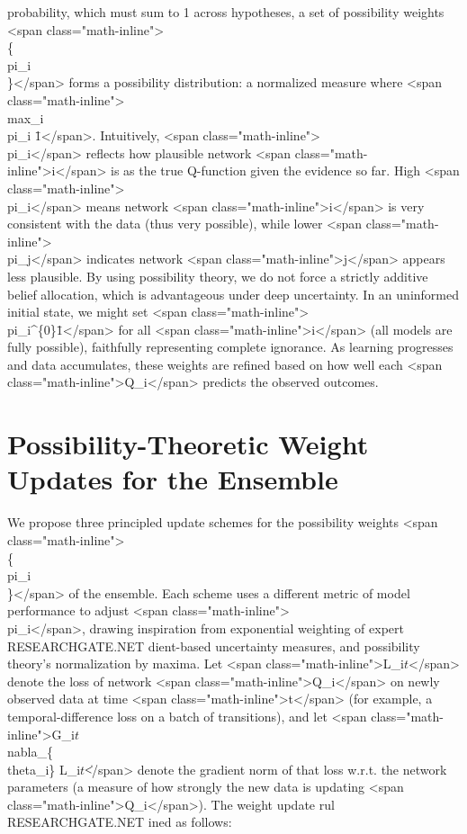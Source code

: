 \documentclass{article}
\begin{document}
probability, which must sum to 1 across hypotheses, a set of possibility weights <span class="math-inline">\\\{\\pi\_i\\\}</span> forms a possibility distribution: a normalized measure where <span class="math-inline">\\max\_i \\pi\_i \= 1</span>. Intuitively, <span class="math-inline">\\pi\_i</span> reflects how plausible network <span class="math-inline">i</span> is as the true Q-function given the evidence so far. High <span class="math-inline">\\pi\_i</span> means network <span class="math-inline">i</span> is very consistent with the data (thus very possible), while lower <span class="math-inline">\\pi\_j</span> indicates network <span class="math-inline">j</span> appears less plausible. By using possibility theory, we do not force a strictly additive belief allocation, which is advantageous under deep uncertainty. In an uninformed initial state, we might set <span class="math-inline">\\pi\_i^\{\(0\)\}\=1</span> for all <span class="math-inline">i</span> (all models are fully possible), faithfully representing complete ignorance. As learning progresses and data accumulates, these weights are refined based on how well each <span class="math-inline">Q\_i</span> predicts the observed outcomes.

\section*{Possibility-Theoretic Weight Updates for the Ensemble}
We propose three principled update schemes for the possibility weights <span class="math-inline">\\\{\\pi\_i\\\}</span> of the ensemble. Each scheme uses a different metric of model performance to adjust <span class="math-inline">\\pi\_i</span>, drawing inspiration from exponential weighting of expert​
RESEARCHGATE.NET
dient-based uncertainty measures, and possibility theory’s normalization by maxima. Let <span class="math-inline">L\_i\(t\)</span> denote the loss of network <span class="math-inline">Q\_i</span> on newly observed data at time <span class="math-inline">t</span> (for example, a temporal-difference loss on a batch of transitions), and let <span class="math-inline">G\_i\(t\) \= \|\\nabla\_\{\\theta\_i\} L\_i\(t\)\|</span> denote the gradient norm of that loss w.r.t. the network parameters (a measure of how strongly the new data is updating <span class="math-inline">Q\_i</span>). The weight update rul​
RESEARCHGATE.NET
ined as follows:
\end{document}
